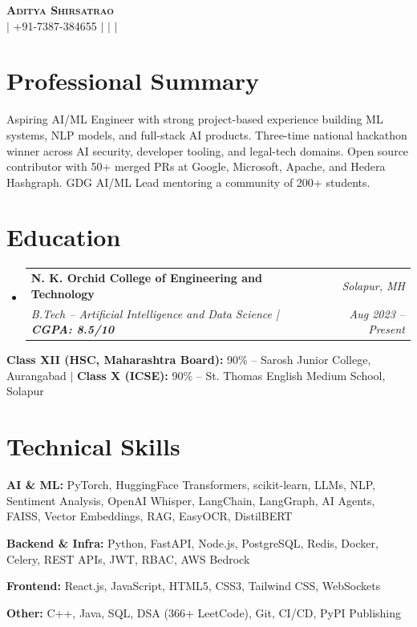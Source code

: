 \documentclass[letterpaper,10pt]{article}
\makeatletter
\newcommand{\resumeSubheading}[4]{
  \vspace{-2pt}\item
    \begin{tabular*}{0.97\textwidth}[t]{l@{\extracolsep{\fill}}r}
      \textbf{#1} & \textit{\small #2} \\
      \textit{\small#3} & \textit{\small #4}
    \end{tabular*}\vspace{-6pt}
}
\newcommand{\resumeSubHeadingListStart}{\begin{itemize}[leftmargin=0.15in, label={}]}
\newcommand{\resumeSubHeadingListEnd}{\end{itemize}}
\makeatother
\begin{document}
\begin{center}
  {\Huge\textbf{\scshape Aditya Shirsatrao}} \\ \vspace{2pt}
  \small
  \href{mailto:adityashirsatrao007@gmail.com}{\faEnvelope} $|$
  +91-7387-384655 $|$
  \href{https://www.linkedin.com/in/adityashirsatrao/}{\faLinkedin} $|$
  \href{https://github.com/adityashirsatrao007}{\faGithub} $|$
  \href{https://leetcode.com/u/adityashirsatrao007/}{\faCode}
\end{center}

\section{Professional Summary}
\small{Aspiring AI/ML Engineer with strong project-based experience building ML systems, NLP models, and full-stack AI products. Three-time national hackathon winner across AI security, developer tooling, and legal-tech domains. Open source contributor with 50+ merged PRs at Google, Microsoft, Apache, and Hedera Hashgraph. GDG AI/ML Lead mentoring a community of 200+ students.}

\section{Education}
\resumeSubHeadingListStart
\resumeSubheading
  {N. K. Orchid College of Engineering and Technology}{Solapur, MH}
  {B.Tech -- Artificial Intelligence and Data Science | \textbf{CGPA: 8.5/10}}{Aug 2023 -- Present}
\resumeSubHeadingListEnd
\small{\textbf{Class XII (HSC, Maharashtra Board):} 90\% -- Sarosh Junior College, Aurangabad $|$ \textbf{Class X (ICSE):} 90\% -- St. Thomas English Medium School, Solapur}\vspace{4pt}

\section{Technical Skills}
\begin{itemize}[leftmargin=0.15in, label={}]
  \small{
  \item{\textbf{AI \& ML:} PyTorch, HuggingFace Transformers, scikit-learn, LLMs, NLP, Sentiment Analysis, OpenAI Whisper, LangChain, LangGraph, AI Agents, FAISS, Vector Embeddings, RAG, EasyOCR, DistilBERT}
  \item{\textbf{Backend \& Infra:} Python, FastAPI, Node.js, PostgreSQL, Redis, Docker, Celery, REST APIs, JWT, RBAC, AWS Bedrock}
  \item{\textbf{Frontend:} React.js, JavaScript, HTML5, CSS3, Tailwind CSS, WebSockets}
  \item{\textbf{Other:} C++, Java, SQL, DSA (366+ LeetCode), Git, CI/CD, PyPI Publishing}
  }
\end{itemize}
\end{document}
